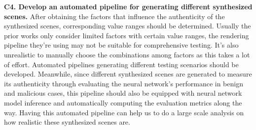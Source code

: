 \textbf{C4. Develop an automated pipeline for generating different synthesized scenes. }
After obtaining the factors that influence the authenticity of the synthesized scenes, corresponding value ranges should be determined.
Usually the prior works only consider limited factors with certain value ranges, 
the rendering pipeline they're using may not be suitable for comprehensive testing.
It's also unrealistic to manually choose the combinations among factors as this takes a lot of effort.
Automated pipelines generating different testing scenarios should be developed.
Meanwhile, since different synthesized scenes are generated to measure its authenticity through evaluating the neural network's performance in benign and malicious cases,
this pipeline should also be equipped with neural network model inference and automatically computing the evaluation metrics along the way.
Having this automated pipeline can help us to do a large scale analysis on how realistic these synthesized scenes are.


